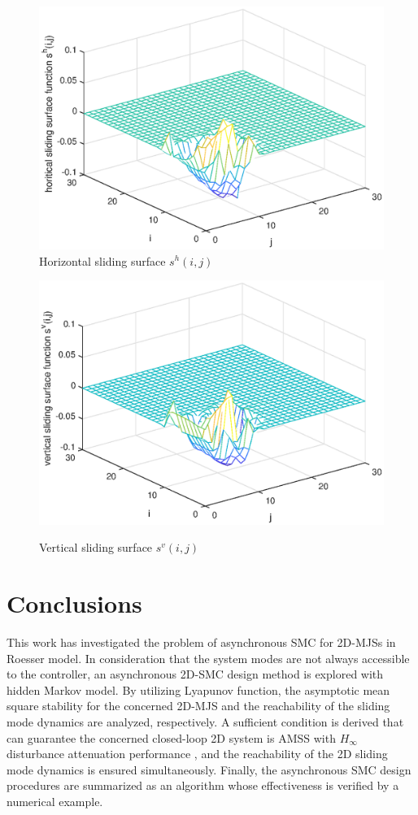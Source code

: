 \documentclass[journal,final,twocolumn]{IEEEtran}
\begin{document}
\begin{figure}[!htb]
	\centering\includegraphics[scale=0.6]{./simulations/hs_eps.eps}
	\caption{Horizontal  sliding surface $s^{h}(i,j)$}
	\label{fig9}
\end{figure}
\begin{figure}[!htb]
	\centering\includegraphics[scale=0.6]{./simulations/vs_eps.eps}\\ 
	\caption{Vertical sliding surface $s^{v}(i,j)$}
	\label{fig10}
\end{figure}


\section{Conclusions} \label{conclusion} 
This work has investigated the problem of asynchronous SMC for 2D-MJSs in Roesser model. In consideration that the system modes are not always accessible to the controller, an asynchronous 2D-SMC design method is explored with hidden Markov model. By utilizing Lyapunov function, the asymptotic mean square stability for the concerned 2D-MJS  and the reachability of the sliding mode dynamics are analyzed, respectively. A sufficient condition is derived that can guarantee the concerned closed-loop 2D system is AMSS with $H_{\infty}$ disturbance attenuation performance , and  the reachability of the 2D sliding mode dynamics is ensured simultaneously. Finally, the asynchronous SMC design procedures are summarized as an algorithm whose effectiveness is verified by a numerical example.
\end{document}
